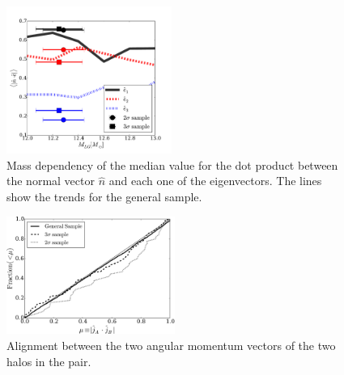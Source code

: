 \documentclass{emulateapj}
\begin{document}

\begin{figure}
\begin{center}
  \includegraphics[width=0.48\textwidth]{median_mass_alignment.pdf}
\caption{Mass dependency of the median value for the dot product
  between the normal vector $\hat{n}$ and each one of the
  eigenvectors.  The lines show the trends for the general sample.
\label{fig:median_alignment_n}}
\end{center}
\end{figure}



\begin{figure}
\begin{center}
  \includegraphics[width=0.49\textwidth]{alignments_jj_all_environments.pdf}
\end{center}
\caption{Alignment between the two angular momentum vectors of the two
  halos in the pair.
    \label{fig:jj_alignment}}  
\end{figure}



\end{document}
